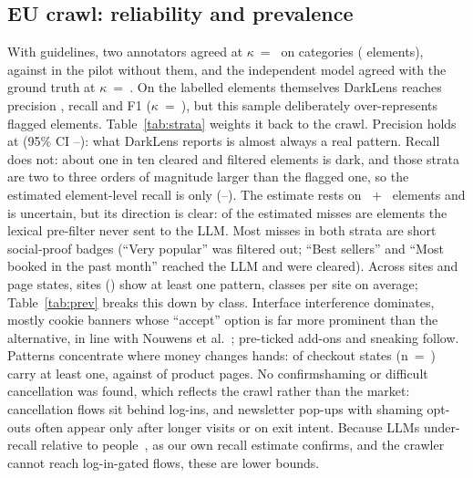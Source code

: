 \documentclass[conference]{IEEEtran}
\begin{document}
\subsection{EU crawl: reliability and prevalence}
With guidelines, two annotators agreed at $\kappa$~=~\SecondKappa{} on categories (\SecondN{} elements),
against \PilotKappa{} in the pilot without them, and the independent model agreed with the ground truth at
$\kappa$~=~\ModelOpKappa{}. On the \CrawlNGold{} labelled elements themselves DarkLens reaches precision
\CrawlSP{}, recall \CrawlSR{} and F1 \CrawlSF{} ($\kappa$~=~\CrawlSKappa{}), but this sample deliberately
over-represents flagged elements. Table~\ref{tab:strata} weights it back to the crawl. Precision holds at
\PopP{} (95\% CI \PopPlo{}--\PopPhi{}): what DarkLens reports is almost always a real pattern. Recall does
not: about one in ten cleared and filtered elements is dark, and those strata are two to three orders of
magnitude larger than the flagged one, so the estimated element-level recall is only \PopR{}
(\PopRlo{}--\PopRhi{}). The estimate rests on \StClearDark{}~+~\StFiltDark{} elements and is uncertain, but its
direction is clear: \PopMissPrefilter{} of the estimated misses are elements the lexical pre-filter never sent to
the LLM. Most misses in both strata are short social-proof badges (``Very popular'' was filtered out;
``Best sellers'' and ``Most booked in the past month'' reached the LLM and were cleared). Across \CrawlSites{} sites and \CrawlStates{} page states, \CrawlAnyN{}
sites (\CrawlAny{}) show at least one pattern, \CrawlMeanCats{} classes per site on average; Table~\ref{tab:prev}
breaks this down by class. Interface interference dominates, mostly cookie banners whose ``accept'' option is far
more prominent than the alternative, in line with Nouwens et al.~\cite{nouwens2020}; pre-ticked add-ons and
sneaking follow. Patterns concentrate where money changes hands: \PTCheckout{} of checkout states
(n~=~\PTCheckoutN{}) carry at least one, against \PTProduct{} of product pages. No confirmshaming or difficult
cancellation was found, which reflects the crawl rather than the market: cancellation flows sit behind log-ins,
and newsletter pop-ups with shaming opt-outs often appear only after longer visits or on exit intent. Because LLMs
under-recall relative to people~\cite{nwokeji2026}, as our own recall estimate confirms, and the crawler cannot
reach log-in-gated flows, these are lower bounds.
\end{document}
